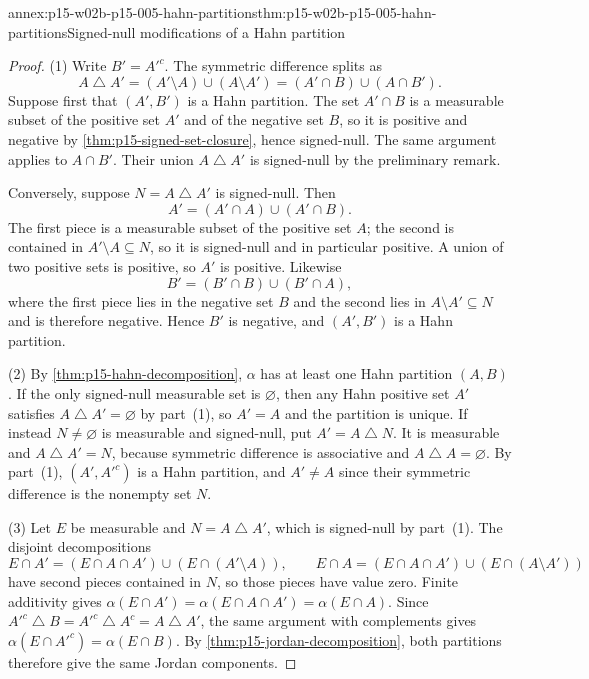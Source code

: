 \begin{annexitem}{annex:p15-w02b-p15-005-hahn-partitions}{thm:p15-w02b-p15-005-hahn-partitions}{Signed-null modifications of a Hahn partition}
\begin{proof}
(1) Write \(B'=A'^c\). The symmetric difference splits as
\[
  A\mathbin{\triangle}A'=(A'\setminus A)\cup(A\setminus A')
                        =(A'\cap B)\cup(A\cap B').
\]
Suppose first that \((A',B')\) is a Hahn partition. The set
\(A'\cap B\) is a measurable subset of the positive set \(A'\) and of
the negative set \(B\), so it is positive and negative by
\cref{thm:p15-signed-set-closure}, hence signed-null. The same argument
applies to \(A\cap B'\). Their union \(A\mathbin{\triangle}A'\) is
signed-null by the preliminary remark.

Conversely, suppose \(N=A\mathbin{\triangle}A'\) is signed-null. Then
\[
  A'=(A'\cap A)\cup(A'\cap B).
\]
The first piece is a measurable subset of the positive set \(A\); the
second is contained in \(A'\setminus A\subseteq N\), so it is
signed-null and in particular positive. A union of two positive sets is
positive, so \(A'\) is positive. Likewise
\[
  B'=(B'\cap B)\cup(B'\cap A),
\]
where the first piece lies in the negative set \(B\) and the second lies
in \(A\setminus A'\subseteq N\) and is therefore negative. Hence \(B'\)
is negative, and \((A',B')\) is a Hahn partition.

(2) By \cref{thm:p15-hahn-decomposition}, \(\alpha\) has at least one
Hahn partition \((A,B)\). If the only signed-null measurable set is
\(\varnothing\), then any Hahn positive set \(A'\) satisfies
\(A\mathbin{\triangle}A'=\varnothing\) by part~(1), so \(A'=A\) and the
partition is unique. If instead \(N\neq\varnothing\) is measurable and
signed-null, put \(A'=A\mathbin{\triangle}N\). It is measurable and
\(A\mathbin{\triangle}A'=N\), because symmetric difference is
associative and \(A\mathbin{\triangle}A=\varnothing\). By part~(1),
\((A',A'^c)\) is a Hahn partition, and \(A'\neq A\) since their
symmetric difference is the nonempty set \(N\).

(3) Let \(E\) be measurable and \(N=A\mathbin{\triangle}A'\), which is
signed-null by part~(1). The disjoint decompositions
\[
  E\cap A'=(E\cap A\cap A')\cup(E\cap(A'\setminus A)),\qquad
  E\cap A=(E\cap A\cap A')\cup(E\cap(A\setminus A'))
\]
have second pieces contained in \(N\), so those pieces have value zero.
Finite additivity gives
\(\alpha(E\cap A')=\alpha(E\cap A\cap A')=\alpha(E\cap A)\).
Since \(A'^c\mathbin{\triangle}B=A'^c\mathbin{\triangle}A^c
=A\mathbin{\triangle}A'\), the same argument with complements gives
\(\alpha(E\cap A'^c)=\alpha(E\cap B)\). By
\cref{thm:p15-jordan-decomposition}, both partitions therefore give the
same Jordan components.
\end{proof}
\end{annexitem}

